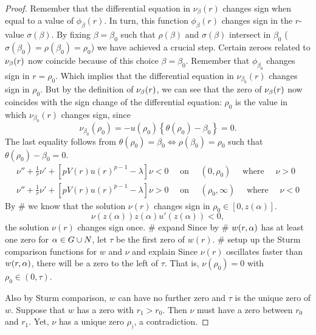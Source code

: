 \begin{lemma}
\begin{proof}
Remember that the differential equation in $\nu_{\beta}(r)$ changes sign when equal to a value of $\phi_\beta(r)$. In turn, this function $\phi_\beta(r)$ changes sign in the $r$-value $\sigma(\beta)$. By fixing $\beta=\beta_0$ such that $\rho(\beta)$ and $\sigma(\beta)$ intersect in $\beta_0$ ($\sigma(\beta_0)=\rho(\beta_0)=\rho_0$) we have achieved a crucial step. Certain zeroes related to $\nu_{\beta}(r)$ now coincide because of this choice $\beta=\beta_0$. Remember that $\phi_{\beta_0}$ changes sign in $r=\rho_0$. Which implies that the differential equation in $\nu_{\beta_0}(r)$ changes sign in $\rho_0$. But by the definition of $\nu_{\beta}(r)$, we can see that the zero of $\nu_{\beta}(r)$ now coincides with the sign change of the differential equation: $\rho_0$ is the value in which $\nu_{\beta_0}(r)$ changes sign, since $$\nu_{\beta_0}(\rho_0)=-u(\rho_0)\left\{\theta(\rho_0)-\beta_0\right\}=0.$$ The last equality follows from $\theta(\rho_0)=\beta_0\iff\rho(\beta_0)=\rho_0$ such that $\theta(\rho_0)-\beta_0=0$.
%
\begin{gather*}
\nu''+\frac{1}{r}\nu'+\left[pV(r)u(r)^{p-1}-\lambda\right]\nu<0\quad\text{ on }\quad(0,\rho_0)\quad\text{ where }\quad\nu>0\\
\nu''+\frac{1}{r}\nu'+\left[pV(r)u(r)^{p-1}-\lambda\right]\nu>0\quad\text{ on }\quad(\rho_0,\infty)\quad\text{ where }\quad\nu<0
\end{gather*}
%
By \# we know that the solution $\nu(r)$ changes sign in $\rho_0\in[0,z(\alpha)]$. $$\nu(z(\alpha))z(\alpha)u'(z(\alpha))<0,$$ the solution $\nu(r)$ changes sign once. \# expand Since by \# $w(r,\alpha)$ has at least one zero for $\alpha\in G\cup N$, let $\tau$ be the first zero of $w(r)$. \# setup up the Sturm comparison functions for $w$ and $\nu$ and explain Since $\nu(r)$ oscillates faster than $w(r,\alpha)$, there will be a zero to the left of $\tau$. That is, $\nu(\rho_0)=0$ with $\rho_0\in(0,\tau)$. 

Also by Sturm comparison, $w$ can have no further zero and $\tau$ is the unique zero of $w$. Suppose that $w$ has a zero with $r_1>r_0$. Then $\nu$ must have a zero between $r_0$ and $r_1$. Yet, $\nu$ has a unique zero $\rho_)$, a contradiction.


\end{proof}
\end{lemma}
